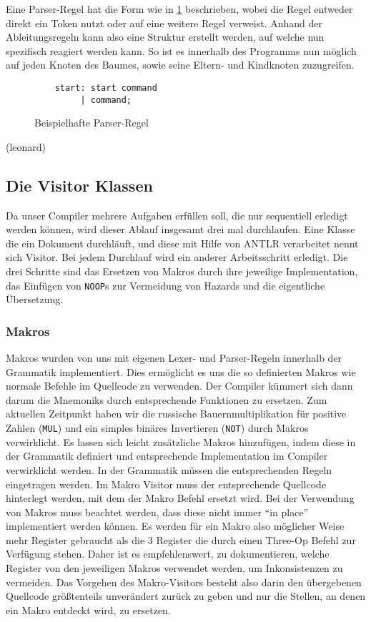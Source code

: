 \documentclass[paper=a4,fontsize=12pt,twocolumn]{scrreprt}
\begin{document}
Eine Parser-Regel hat die Form wie in \ref{fig:Parser_Commands} beschrieben,
wobei die Regel entweder direkt ein Token nutzt oder auf eine weitere Regel verweist.
Anhand der Ableitungsregeln kann also eine Struktur erstellt werden, auf welche nun spezifisch reagiert werden kann.
So ist es innerhalb des Programms nun möglich auf jeden Knoten des Baumes, sowie seine Eltern- und Kindknoten zuzugreifen.

\begin{figure}[h]
    \centering
    \begin{lstlisting}
    start: start command 
         | command;
    \end{lstlisting}
    \caption{Beispielhafte Parser-Regel}
    \label{fig:Parser_Commands}
\end{figure}

(leonard)

\subsection{Die Visitor Klassen}
\label{subsec:die_visitor_klassen}
Da unser Compiler mehrere Aufgaben erfüllen soll, die nur sequentiell erledigt werden können, wird dieser Ablauf insgesamt drei mal durchlaufen.
Eine Klasse die ein Dokument durchläuft, und diese mit Hilfe von ANTLR verarbeitet nennt sich Visitor.
Bei jedem Durchlauf wird ein anderer Arbeitsschritt erledigt.
Die drei Schritte sind das Ersetzen von Makros durch ihre jeweilige Implementation, das Einfügen von \texttt{NOOP}s zur Vermeidung von Hazards und die eigentliche Übersetzung.

\subsubsection{Makros}
Makros wurden von uns mit eigenen Lexer- und Parser-Regeln innerhalb der Grammatik implementiert.
Dies ermöglicht es uns die so definierten Makros wie normale Befehle im Quellcode zu verwenden.
Der Compiler kümmert sich dann darum die Mnemoniks durch entsprechende Funktionen zu ersetzen.
Zum aktuellen Zeitpunkt haben wir die russische Bauernmultiplikation für positive Zahlen (\texttt{MUL}) und ein simples binäres Invertieren (\texttt{NOT}) durch Makros verwirklicht.
Es lassen sich leicht zusätzliche Makros hinzufügen, indem diese in der Grammatik definiert und entsprechende Implementation im Compiler verwirklicht werden.
In der Grammatik müssen die entsprechenden Regeln eingetragen werden. Im Makro Visitor muss der entsprechende Quellcode hinterlegt werden, mit dem der Makro Befehl ersetzt wird.
Bei der Verwendung von Makros muss beachtet werden, dass diese nicht immer \enquote{in place} implementiert werden können.
Es werden für ein Makro also möglicher Weise mehr Register gebraucht als die 3 Register die durch einen Three-Op Befehl zur Verfügung stehen.
Daher ist es empfehlenswert, zu dokumentieren, welche Register von den jeweiligen Makros verwendet werden, um Inkonsistenzen zu vermeiden.
Das Vorgehen des Makro-Visitors besteht also darin den übergebenen Quellcode größtenteils unverändert zurück zu geben und nur die Stellen, an denen ein Makro entdeckt wird, zu ersetzen.
\end{document}
